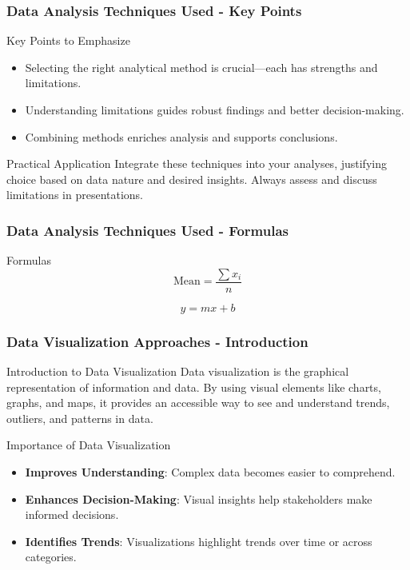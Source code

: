 \documentclass{beamer}
\begin{document}
\begin{frame}[fragile]
    \frametitle{Data Analysis Techniques Used - Key Points}
    \begin{block}{Key Points to Emphasize}
        \begin{itemize}
            \item Selecting the right analytical method is crucial—each has strengths and limitations.
            \item Understanding limitations guides robust findings and better decision-making.
            \item Combining methods enriches analysis and supports conclusions.
        \end{itemize}
    \end{block}
    
    \begin{block}{Practical Application}
        Integrate these techniques into your analyses, justifying choice based on data nature and desired insights. Always assess and discuss limitations in presentations.
    \end{block}
\end{frame}

\begin{frame}[fragile]
    \frametitle{Data Analysis Techniques Used - Formulas}
    \begin{block}{Formulas}
        \begin{equation}
            \text{Mean} = \frac{\sum x_i}{n}
        \end{equation}
        
        \begin{equation}
            y = mx + b
        \end{equation}
    \end{block}
\end{frame}

\begin{frame}[fragile]
    \frametitle{Data Visualization Approaches - Introduction}
    
    \begin{block}{Introduction to Data Visualization}
        Data visualization is the graphical representation of information and data. By using visual elements like charts, graphs, and maps, it provides an accessible way to see and understand trends, outliers, and patterns in data.
    \end{block}
    
    \begin{block}{Importance of Data Visualization}
        \begin{itemize}
            \item \textbf{Improves Understanding}: Complex data becomes easier to comprehend.
            \item \textbf{Enhances Decision-Making}: Visual insights help stakeholders make informed decisions.
            \item \textbf{Identifies Trends}: Visualizations highlight trends over time or across categories.
        \end{itemize}
    \end{block}
\end{frame}
\end{document}
